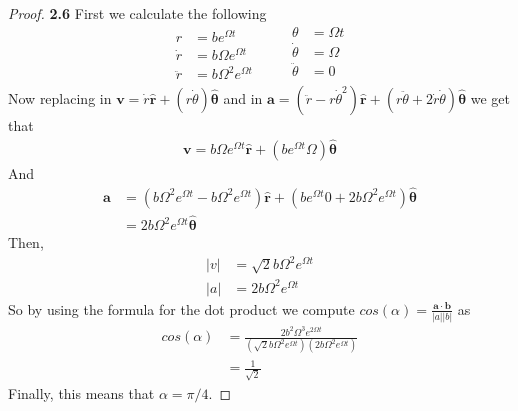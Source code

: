 \documentclass[11pt]{article}
\begin{document}
    \begin{proof}{\textbf{2.6}}
        First we calculate the following
        \begin{equation*}
            \begin{split}
                r &= be^{\Omega t} \\
                \dot{r} &= b\Omega e^{\Omega t} \\
                \ddot{r} &= b\Omega^2 e^{\Omega t}
            \end{split}
            \quad\quad
            \begin{split}
                \theta &= \Omega t \\
                \dot{\theta} &= \Omega \\
                \ddot{\theta} &= 0 \\
            \end{split}
        \end{equation*}
        Now replacing in $\bm{v} = \dot{r}\hat{\bm{r}} +(r\dot{\theta})\hat{\bm{\theta}}$
        and in $\bm{a} = (\ddot{r} - r\dot{\theta}^2)\hat{\bm{r}} + (r\ddot{\theta} + 2\dot{r}\dot{\theta})\hat{\bm{\theta}}$
        we get that
        \begin{align*}
            \bm{v} = b\Omega e^{\Omega t}\hat{\bm{r}} +(be^{\Omega t}\Omega)\hat{\bm{\theta}}
        \end{align*}
        And
        \begin{align*}
            \bm{a} &= (b\Omega^2 e^{\Omega t} - b\Omega^2 e^{\Omega t})\hat{\bm{r}} + (be^{\Omega t}0 + 2b\Omega^2 e^{\Omega t})\hat{\bm{\theta}} \\
                   &= 2b\Omega^2 e^{\Omega t}\hat{\bm{\theta}}
        \end{align*}
        Then,
        \begin{align*}
            |v| &= \sqrt{2}b\Omega^2 e^{\Omega t} \\
            |a| &= 2b\Omega^2 e^{\Omega t}
        \end{align*}
        So by using the formula for the dot product we compute
        $cos(\alpha) = \frac{\bm{a} \cdot \bm{b}}{|a||b|}$ as
        \begin{align*}
            cos(\alpha) &= \frac{2b^2\Omega^3 e^{2\Omega t}}{(\sqrt{2}b\Omega^2 e^{\Omega t})(2b\Omega^2 e^{\Omega t})} \\
             &= \frac{1}{\sqrt{2}}
        \end{align*}
        Finally, this means that $\alpha = \pi / 4$.
    \end{proof}
\end{document}
